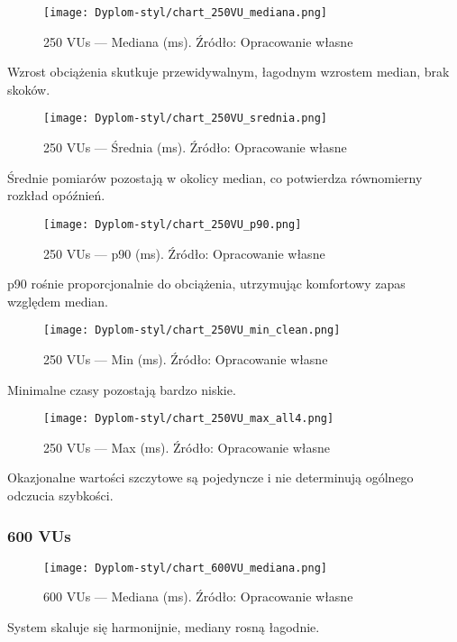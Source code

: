 \begin{figure}[H]\centering
\texttt{[image: Dyplom-styl/chart\_250VU\_mediana.png]}
\caption{250 VUs --- Mediana (ms). Źródło: Opracowanie własne}\label{fig:250-mediana}
\end{figure}
Wzrost obciążenia skutkuje przewidywalnym, łagodnym wzrostem median, brak skoków.

\begin{figure}[H]\centering
\texttt{[image: Dyplom-styl/chart\_250VU\_srednia.png]}
\caption{250 VUs --- Średnia (ms). Źródło: Opracowanie własne}\label{fig:250-srednia}
\end{figure}
Średnie pomiarów pozostają w okolicy median, co potwierdza równomierny rozkład opóźnień.

\begin{figure}[H]\centering
\texttt{[image: Dyplom-styl/chart\_250VU\_p90.png]}
\caption{250 VUs --- p90 (ms). Źródło: Opracowanie własne}\label{fig:250-p90}
\end{figure}
p90 rośnie proporcjonalnie do obciążenia, utrzymując komfortowy zapas względem median.

\begin{figure}[H]\centering
\texttt{[image: Dyplom-styl/chart\_250VU\_min\_clean.png]}
\caption{250 VUs --- Min (ms). Źródło: Opracowanie własne}\label{fig:250-min}
\end{figure}
Minimalne czasy pozostają bardzo niskie.

\begin{figure}[H]\centering
\texttt{[image: Dyplom-styl/chart\_250VU\_max\_all4.png]}
\caption{250 VUs --- Max (ms). Źródło: Opracowanie własne}\label{fig:250-max}
\end{figure}
Okazjonalne wartości szczytowe są pojedyncze i nie determinują ogólnego odczucia szybkości.

\subsubsection{600 VUs}

\begin{figure}[H]\centering
\texttt{[image: Dyplom-styl/chart\_600VU\_mediana.png]}
\caption{600 VUs --- Mediana (ms). Źródło: Opracowanie własne}\label{fig:600-mediana}
\end{figure}
System skaluje się harmonijnie, mediany rosną łagodnie.

